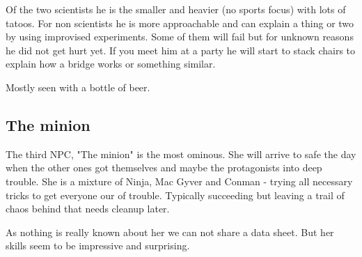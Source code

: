 \begin{npcBox}[title=R*]
    \begin{consequences}
    \item {}
    \item {}
    \item {}
    \end{consequences}

    \begin{npcDescription}
    Of the two scientists he is the smaller and heavier (no sports focus) with lots of tatoos. For non scientists he is more approachable and can explain a thing or two by using improvised experiments. Some of them will fail but for unknown reasons he did not get hurt yet.
    If you meet him at a party he will start to stack chairs to explain how a bridge works or something similar.

    Mostly seen with a bottle of beer.
    \end{npcDescription}

\end{npcBox}

\subsection{The minion}

The third NPC, "The minion" is the most ominous. She will arrive to safe the day when the other ones got themselves and maybe the protagonists into deep trouble. She is a mixture of Ninja, Mac Gyver and Conman - trying all necessary tricks to get everyone our of trouble. Typically succeeding but leaving a trail of chaos behind that needs cleanup later.

As nothing is really known about her we can not share a data sheet. But her skills seem to be impressive and surprising.